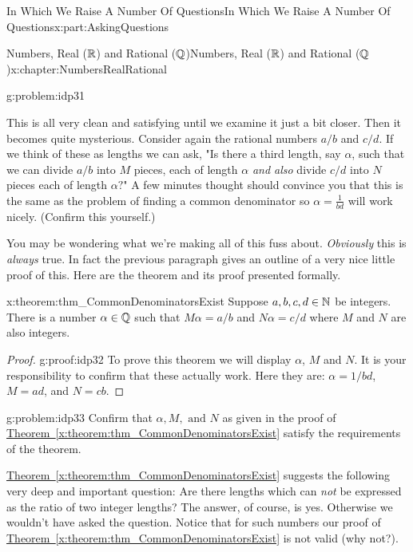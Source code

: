 \begin{partptx}{In Which We Raise A Number Of Questions}{}{In Which We Raise A Number Of Questions}{}{}{x:part:AskingQuestions}
\begin{chapterptx}{Numbers, Real (\(\mathbb {R}\)) and Rational (\(\mathbb {Q}\))}{}{Numbers, Real (\(\mathbb {R}\)) and Rational (\(\mathbb {Q}\))}{}{}{x:chapter:NumbersRealRational}
\begin{introduction}{}
\begin{problem}{}{g:problem:idp31}
			\end{problem}
			This is all very clean and satisfying until we examine it just a bit closer. Then it becomes quite mysterious. Consider again the rational numbers \(a/b\) and \(c/d\). If we think of these as lengths we can ask, "Is there a third length, say \(\alpha\), such that we can divide \(a/b\) into \(M\) pieces, each of length \(\alpha\) \emph{and also} divide \(c/d\) into \(N\) pieces each of length \(\alpha?\)" A few minutes thought should convince you that this is the same as the problem of finding a common denominator so \(\alpha=\frac{1}{bd}\) will work nicely. (Confirm this yourself.)%
			\par
			You may be wondering what we're making all of this fuss about. \emph{Obviously} this is \emph{always} true. In fact the previous paragraph gives an outline of a very nice little proof of this. Here are the theorem and its proof presented formally.%
			\begin{theorem}{}{}{x:theorem:thm_CommonDenominatorsExist}%
				 Suppose \(a, b, c, d \in\mathbb {N}\) be integers. There is a number \(\alpha\in\mathbb {Q}\) such that \(M\alpha=a/b\) and \(N\alpha=c/d\) where \(M\) and \(N\) are also integers.%
			\end{theorem}
			\begin{proof}{}{g:proof:idp32}
				To prove this theorem we will display \(\alpha\), \(M\) and \(N\). It is your responsibility to confirm that these actually work. Here they are: \(\alpha=1/bd\), \(M=ad\), and \(N=cb\).%
			\end{proof}
			\begin{problem}{}{g:problem:idp33}%
				 Confirm that \(\alpha, M, \text{ and } N\) as given in the proof of \hyperref[x:theorem:thm_CommonDenominatorsExist]{Theorem~{\xreffont\ref{x:theorem:thm_CommonDenominatorsExist}}} satisfy the requirements of the theorem.%
			\end{problem}
			\hyperref[x:theorem:thm_CommonDenominatorsExist]{Theorem~{\xreffont\ref{x:theorem:thm_CommonDenominatorsExist}}} suggests the following very deep and important question: Are there lengths which can \emph{not} be expressed as the ratio of two integer lengths? The answer, of course, is yes. Otherwise we wouldn't have asked the question. Notice that for such numbers our proof of \hyperref[x:theorem:thm_CommonDenominatorsExist]{Theorem~{\xreffont\ref{x:theorem:thm_CommonDenominatorsExist}}} is not valid (why not?).%
			\par

\end{introduction}
\end{chapterptx}
\end{partptx}
